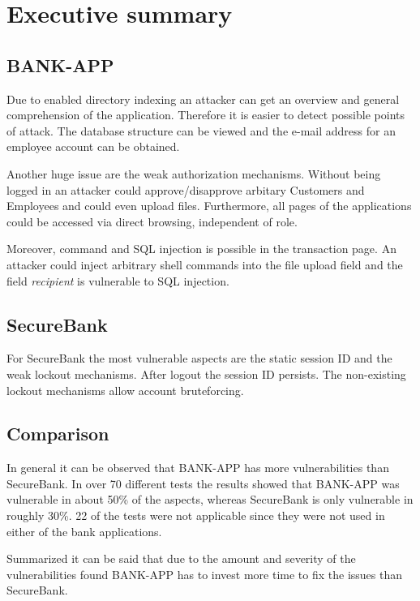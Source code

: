 \chapter{Executive summary}
\section*{BANK-APP}
Due to enabled directory indexing an attacker can get an overview and general comprehension of the application. Therefore it is easier to detect possible points of attack. The database structure can be viewed and the e-mail address for an employee account can be obtained.

Another huge issue are the weak authorization mechanisms. Without being logged in an attacker could approve/disapprove arbitary Customers and Employees and could even upload files. Furthermore, all pages of the applications could be accessed via direct browsing, independent of role.

Moreover, command and SQL injection is possible in the transaction page. An attacker could inject arbitrary shell commands into the file upload field and the field \emph{recipient} is vulnerable to SQL injection.

\section*{SecureBank}
For SecureBank the most vulnerable aspects are the static session ID and the weak lockout mechanisms. After logout the session ID persists. The non-existing lockout mechanisms allow account bruteforcing.

\section*{Comparison}
In general it can be observed that BANK-APP has more vulnerabilities than SecureBank. In over 70 different tests the results showed that BANK-APP was vulnerable in about 50\% of the aspects, whereas SecureBank is only vulnerable in roughly 30\%. 22 of the tests were not applicable since they were not used in either of the bank applications.

Summarized it can be said that due to the amount and severity of the vulnerabilities found BANK-APP has to invest more time to fix the issues than SecureBank.